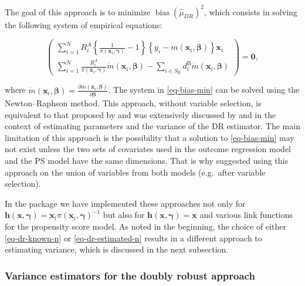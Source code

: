 \documentclass[
]{jss}
\begin{document}
The goal of this approach is to minimize
\(\operatorname{bias}\left(\hat{\mu}_{D R}\right)^2\), which consists in
solving the following system of empirical equations:

\begin{equation}
\left(\begin{array}{c}
\sum_{i=1}^N R_i^A\left\{\frac{1}{\pi\left(\boldsymbol{x}_i, \boldsymbol{\gamma}\right)}-1\right\}\left\{y_i-m\left(\boldsymbol{x}_i, \boldsymbol{\beta}\right)\right\} \boldsymbol{x}_i \\
\sum_{i=1}^N \frac{R_i^A}{\pi\left(\boldsymbol{x}_i, \boldsymbol{\gamma}\right)} \dot{m}\left(\boldsymbol{x}_i, \boldsymbol{\beta}\right) -\sum_{i \in S_{\mathrm{B}}} d_i^{\mathrm{B}} \dot{m}\left(\boldsymbol{x}_i, \boldsymbol{\beta}\right)
\end{array}\right) = \boldsymbol{0},
\label{eq-bias-min}
\end{equation}

where
\(\dot{m}\left(\boldsymbol{x}_i, \boldsymbol{\beta}\right)=\frac{\partial m\left(\boldsymbol{x}_i, \boldsymbol{\beta}\right)}{\partial \boldsymbol{\beta}}\).
The system in \eqref{eq-bias-min} can be solved using the
Newton--Raphson method. This approach, without variable selection, is
equivalent to that proposed by \citet{kim2014doubly} and was extensively
discussed by \citet{chen2020doubly} and \citet{wu2022statistical} in the
context of estimating parameters and the variance of the DR estimator.
The main limitation of this approach is the possibility that a solution
to \eqref{eq-bias-min} may not exist unless the two sets of covariates
used in the outcome regression model and the PS model have the same
dimensions. That is why \citet{yang_doubly_2020} suggested using this
approach on the union of variables from both models (e.g.~after variable
selection).

In the  package we have implemented these approaches not
only for
\(\boldsymbol{h}(\boldsymbol{x}, \boldsymbol{\gamma})=\boldsymbol{x}_i \pi\left(\boldsymbol{x}_i, \boldsymbol{\gamma}\right)^{-1}\)
but also for
\(\boldsymbol{h}(\boldsymbol{x}, \boldsymbol{\gamma})=\boldsymbol{x}\)
and various link functions for the propensity score model. As noted in
the beginning, the choice of either \eqref{eq-dr-known-n} or
\eqref{eq-dr-estimated-n} results in a different approach to estimating
variance, which is discussed in the next subsection.

\subsubsection{Variance estimators for the doubly robust
approach}\label{variance-estimators-for-the-doubly-robust-approach}
\end{document}
